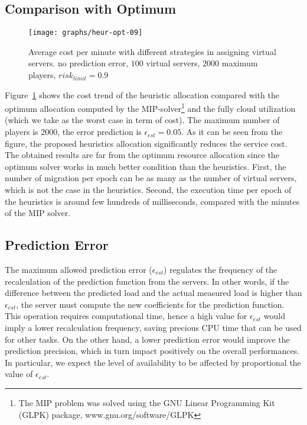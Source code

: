 \documentclass[final,10pt,a5paper]{phdimt}
\theoremstyle{definition}
\begin{document}
\subsection{Comparison with Optimum}


\begin{figure}[tbh]
\centering
\texttt{[image: graphs/heur-opt-09]}
\caption{Average cost per minute with different strategies in assigning virtual servers. no prediction error, $100$ virtual servers, $2000$ maximum players, $risk_{limit} = 0.9$}
\label{fig:heur-opt-09}
\end{figure}

Figure~\ref{fig:heur-opt-09} shows the cost trend of the heuristic allocation compared with the optimum allocation computed by the MIP-solver\footnote{The MIP problem was solved using the GNU Linear Programming Kit (GLPK) package, www.gnu.org/software/GLPK} and the fully cloud utilization (which we take as the worst case in term of cost).
The maximum number of players is 2000, the error prediction is $\epsilon_{est}=0.05$.
As it can be seen from the figure, the proposed heuristics allocation significantly reduces the service cost. The obtained results are far from the optimum resource allocation since the optimum solver works in much better condition than the heuristics. First, the number of migration per epoch can be as many as the number of virtual servers, which is not the case in the heuristics. Second, the execution time per epoch of the heuristics is around few hundreds of milliseconds, compared with the minutes of the MIP solver.



\subsection{Prediction Error}

The maximum allowed prediction error ($\epsilon_{est}$) regulates the frequency of the recalculation of the prediction function from the servers. In other words, if the difference between the predicted load and the actual measured load is higher than $\epsilon_{est}$, the server must compute the new coefficients for the prediction function.
This operation requires computational time, hence a high value for $\epsilon_{est}$ would imply a lower recalculation frequency, saving precious CPU time that can be used for other tasks. On the other hand, a lower prediction error would improve the prediction precision, which in turn impact positively on the overall performances. In particular, we expect the level of availability to be affected by proportional the value of $\epsilon_{est}$.
\end{document}
